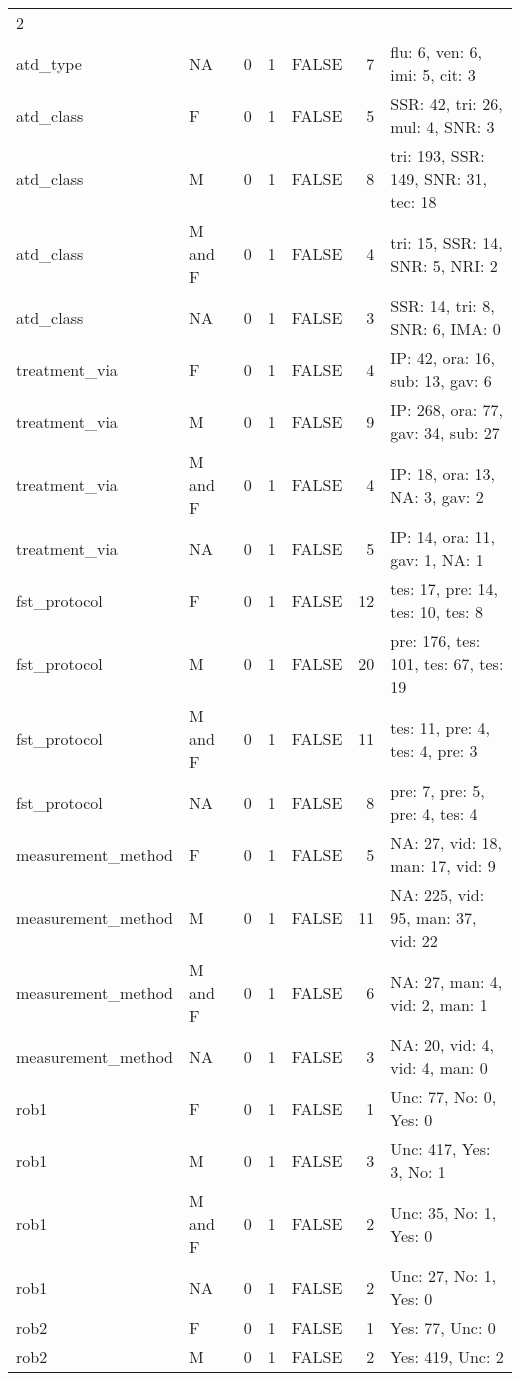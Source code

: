 \documentclass[
]{article}
\begin{document}
\begin{longtable}[]{@{}llrrlrl@{}}
2 \\
atd\_type & NA & 0 & 1 & FALSE & 7 & flu: 6, ven: 6, imi: 5, cit: 3 \\
atd\_class & F & 0 & 1 & FALSE & 5 & SSR: 42, tri: 26, mul: 4, SNR: 3 \\
atd\_class & M & 0 & 1 & FALSE & 8 & tri: 193, SSR: 149, SNR: 31, tec:
18 \\
atd\_class & M and F & 0 & 1 & FALSE & 4 & tri: 15, SSR: 14, SNR: 5,
NRI: 2 \\
atd\_class & NA & 0 & 1 & FALSE & 3 & SSR: 14, tri: 8, SNR: 6, IMA: 0 \\
treatment\_via & F & 0 & 1 & FALSE & 4 & IP: 42, ora: 16, sub: 13, gav:
6 \\
treatment\_via & M & 0 & 1 & FALSE & 9 & IP: 268, ora: 77, gav: 34, sub:
27 \\
treatment\_via & M and F & 0 & 1 & FALSE & 4 & IP: 18, ora: 13, NA: 3,
gav: 2 \\
treatment\_via & NA & 0 & 1 & FALSE & 5 & IP: 14, ora: 11, gav: 1, NA:
1 \\
fst\_protocol & F & 0 & 1 & FALSE & 12 & tes: 17, pre: 14, tes: 10, tes:
8 \\
fst\_protocol & M & 0 & 1 & FALSE & 20 & pre: 176, tes: 101, tes: 67,
tes: 19 \\
fst\_protocol & M and F & 0 & 1 & FALSE & 11 & tes: 11, pre: 4, tes: 4,
pre: 3 \\
fst\_protocol & NA & 0 & 1 & FALSE & 8 & pre: 7, pre: 5, pre: 4, tes:
4 \\
measurement\_method & F & 0 & 1 & FALSE & 5 & NA: 27, vid: 18, man: 17,
vid: 9 \\
measurement\_method & M & 0 & 1 & FALSE & 11 & NA: 225, vid: 95, man:
37, vid: 22 \\
measurement\_method & M and F & 0 & 1 & FALSE & 6 & NA: 27, man: 4, vid:
2, man: 1 \\
measurement\_method & NA & 0 & 1 & FALSE & 3 & NA: 20, vid: 4, vid: 4,
man: 0 \\
rob1 & F & 0 & 1 & FALSE & 1 & Unc: 77, No: 0, Yes: 0 \\
rob1 & M & 0 & 1 & FALSE & 3 & Unc: 417, Yes: 3, No: 1 \\
rob1 & M and F & 0 & 1 & FALSE & 2 & Unc: 35, No: 1, Yes: 0 \\
rob1 & NA & 0 & 1 & FALSE & 2 & Unc: 27, No: 1, Yes: 0 \\
rob2 & F & 0 & 1 & FALSE & 1 & Yes: 77, Unc: 0 \\
rob2 & M & 0 & 1 & FALSE & 2 & Yes: 419, Unc: 2 \\

\end{longtable}
\end{document}
